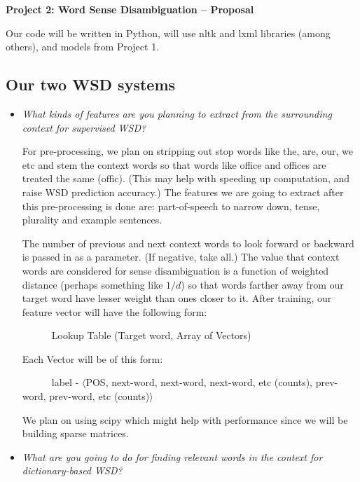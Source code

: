 \documentclass{article}
\begin{document}
\begin{center}\textbf{Project 2: Word Sense Disambiguation -- Proposal}\end{center}

Our code will be written in Python, will use nltk and lxml libraries (among others), and models from Project 1.

\subsection*{Our two WSD systems}

\begin{itemize}
\item \textit{What kinds of features are you planning to extract from the surrounding context for supervised WSD?}\par

For pre-processing, we plan on stripping out stop words like the, are, our, we etc and stem the context words so that words like office and offices are treated the same (offic). (This may help with speeding up computation, and raise WSD prediction accuracy.) The features we are going to extract after this pre-processing is done are: part-of-speech to narrow down, tense, plurality and example sentences.\par
The number of previous and next context words to look forward or backward is passed in as a parameter. (If negative, take all.) The value that context words are considered for sense disambiguation is a function of weighted distance (perhaps something like $1/d$) so that words farther away from our target word have lesser weight than ones closer to it. After training, our feature vector will have the following form:\par
\ \ \ \ \ \ Lookup Table (Target word, Array of Vectors)\par
Each Vector will be of this form:\par
\ \ \ \ \ \ label - $\langle$POS, next-word, next-word, next-word, etc (counts), prev-word, prev-word, etc (counts)$\rangle$\par
We plan on using scipy which might help with performance since we will be building sparse matrices.

\item \textit{What are you going to do for finding relevant words in the context for
dictionary-based WSD?}\par


\end{itemize}
\end{document}
